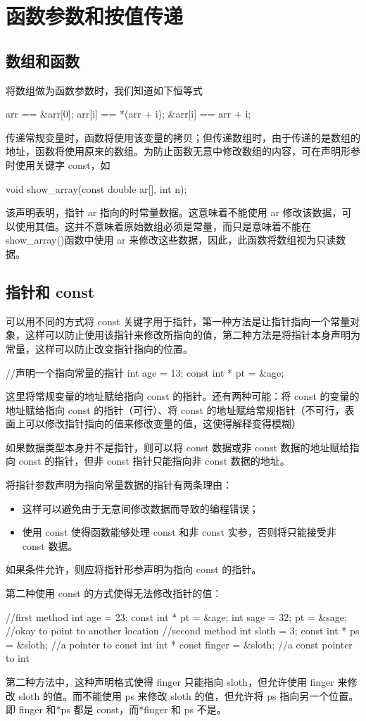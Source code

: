 \section{函数参数和按值传递}
\subsection{数组和函数}
将数组做为函数参数时，我们知道如下恒等式
\begin{ccode}
arr == &arr[0];
arr[i] == *(arr + i);
&arr[i] == arr + i;
\end{ccode}
传递常规变量时，函数将使用该变量的拷贝；但传递数组时，由于传递的是数组的地址，函数将使用原来的数组。为防止函数无意中修改数组的内容，可在声明形参时使用关键字 const，如
\begin{ccode}
void show_array(const double ar[], int n);
\end{ccode}
该声明表明，指针 ar 指向的时常量数据。这意味着不能使用 ar 修改该数据，可以使用其值。这并不意味着原始数组必须是常量，而只是意味着不能在 show\_array()函数中使用 ar 来修改这些数据，因此，此函数将数组视为只读数据。
\subsection{指针和 const}
可以用不同的方式将 const 关键字用于指针，第一种方法是让指针指向一个常量对象，这样可以防止使用该指针来修改所指向的值，第二种方法是将指针本身声明为常量，这样可以防止改变指针指向的位置。
\begin{ccode}
//声明一个指向常量的指针
int age = 13;
const int * pt = &age;
\end{ccode}
这里将常规变量的地址赋给指向 const 的指针。还有两种可能：将 const 的变量的地址赋给指向 const 的指针（可行）、将 const 的地址赋给常规指针（不可行，表面上可以修改指针指向的值来修改变量的值，这使得解释变得模糊）
\begin{marker}
如果数据类型本身并不是指针，则可以将 const 数据或非 const 数据的地址赋给指向 const 的指针，但非 const 指针只能指向非 const 数据的地址。
\end{marker}
\begin{tcolorbox}[title=尽可能使用 const,colback=yellow!5!white,center title]
将指针参数声明为指向常量数据的指针有两条理由：
\begin{itemize}
	\setlength{\itemsep}{0pt}
	\setlength{\parsep}{0pt}
	\setlength{\parskip}{0pt}
	\item 这样可以避免由于无意间修改数据而导致的编程错误；
	\item 使用 const 使得函数能够处理 const 和非 const 实参，否则将只能接受非 const 数据。
\end{itemize}
如果条件允许，则应将指针形参声明为指向 const 的指针。
\end{tcolorbox}
第二种使用 const 的方式使得无法修改指针的值：
\begin{ccode}
//first method
int age = 23;
const int * pt = &age;
int sage = 32;
pt = &sage; //okay to point to another location
//second method
int sloth = 3;
const int * ps = &sloth; //a pointer to const int
int * const finger = &sloth; //a const pointer to int
\end{ccode}
第二种方法中，这种声明格式使得 finger 只能指向 sloth，但允许使用 finger 来修改 sloth 的值。而不能使用 ps 来修改 sloth 的值，但允许将 ps 指向另一个位置。即 finger 和*ps 都是 const，而*finger 和 ps 不是。
